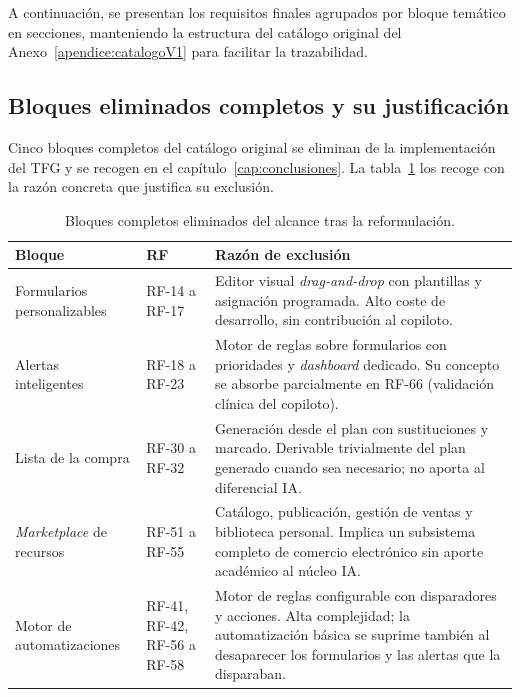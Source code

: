A continuación, se presentan los requisitos finales agrupados por bloque temático en secciones, manteniendo la estructura del catálogo original del Anexo~\ref{apendice:catalogoV1} para facilitar la trazabilidad.

\subsection{Bloques eliminados completos y su justificación}

Cinco bloques completos del catálogo original se eliminan de la implementación del TFG y se recogen en el capítulo~\ref{cap:conclusiones}. La tabla~\ref{tab:bloquesEliminados} los recoge con la razón concreta que justifica su exclusión.

\begin{table}[htbp]
\centering
\small
\begin{tabular}{|p{3.2cm}|p{2.2cm}|p{5.9cm}|}
\hline
\textbf{Bloque} & \textbf{RF} & \textbf{Razón de exclusión} \\
\hline
Formularios personalizables & RF-14 a RF-17 & Editor visual \textit{drag-and-drop} con plantillas y asignación programada. Alto coste de desarrollo, sin contribución al copiloto. \\
\hline
Alertas inteligentes & RF-18 a RF-23 & Motor de reglas sobre formularios con prioridades y \textit{dashboard} dedicado. Su concepto se absorbe parcialmente en RF-66 (validación clínica del copiloto). \\
\hline
Lista de la compra & RF-30 a RF-32 & Generación desde el plan con sustituciones y marcado. Derivable trivialmente del plan generado cuando sea necesario; no aporta al diferencial IA. \\
\hline
\textit{Marketplace} de recursos & RF-51 a RF-55 & Catálogo, publicación, gestión de ventas y biblioteca personal. Implica un subsistema completo de comercio electrónico sin aporte académico al núcleo IA. \\
\hline
Motor de automatizaciones & RF-41, RF-42, RF-56 a RF-58 & Motor de reglas configurable con disparadores y acciones. Alta complejidad; la automatización básica se suprime también al desaparecer los formularios y las alertas que la disparaban. \\
\hline
\end{tabular}
\caption{Bloques completos eliminados del alcance tras la reformulación.}
\label{tab:bloquesEliminados}
\end{table}

